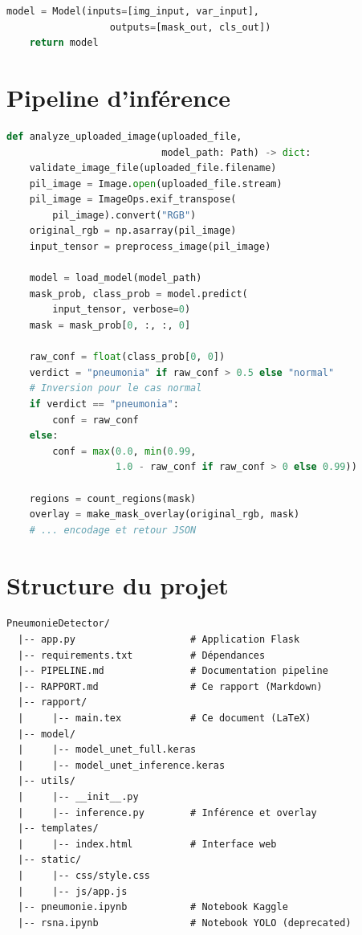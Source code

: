 \documentclass[12pt,a4paper,twoside]{report}
\begin{document}
\begin{appendix}
\begin{lstlisting}[language=Python, caption=Fonction de construction de l'U-Net résiduelle]
    model = Model(inputs=[img_input, var_input],
                  outputs=[mask_out, cls_out])
    return model
\end{lstlisting}

\section{Pipeline d'inférence}

\begin{lstlisting}[language=Python, caption=Fonction d'inférence]
def analyze_uploaded_image(uploaded_file,
                           model_path: Path) -> dict:
    validate_image_file(uploaded_file.filename)
    pil_image = Image.open(uploaded_file.stream)
    pil_image = ImageOps.exif_transpose(
        pil_image).convert("RGB")
    original_rgb = np.asarray(pil_image)
    input_tensor = preprocess_image(pil_image)

    model = load_model(model_path)
    mask_prob, class_prob = model.predict(
        input_tensor, verbose=0)
    mask = mask_prob[0, :, :, 0]

    raw_conf = float(class_prob[0, 0])
    verdict = "pneumonia" if raw_conf > 0.5 else "normal"
    # Inversion pour le cas normal
    if verdict == "pneumonia":
        conf = raw_conf
    else:
        conf = max(0.0, min(0.99,
                   1.0 - raw_conf if raw_conf > 0 else 0.99))

    regions = count_regions(mask)
    overlay = make_mask_overlay(original_rgb, mask)
    # ... encodage et retour JSON
\end{lstlisting}

\section{Structure du projet}

\begin{verbatim}
PneumonieDetector/
  |-- app.py                    # Application Flask
  |-- requirements.txt          # Dépendances
  |-- PIPELINE.md               # Documentation pipeline
  |-- RAPPORT.md                # Ce rapport (Markdown)
  |-- rapport/
  |     |-- main.tex            # Ce document (LaTeX)
  |-- model/
  |     |-- model_unet_full.keras
  |     |-- model_unet_inference.keras
  |-- utils/
  |     |-- __init__.py
  |     |-- inference.py        # Inférence et overlay
  |-- templates/
  |     |-- index.html          # Interface web
  |-- static/
  |     |-- css/style.css
  |     |-- js/app.js
  |-- pneumonie.ipynb           # Notebook Kaggle
  |-- rsna.ipynb                # Notebook YOLO (deprecated)
\end{verbatim}

\end{appendix}
\end{document}
